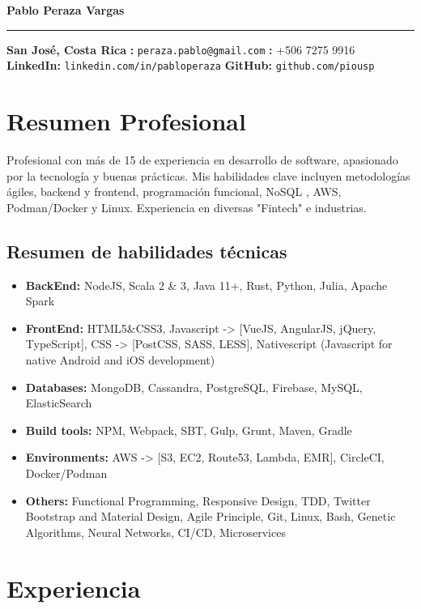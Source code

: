 \documentclass[a4paper,10pt]{article}
\begin{document}
\begin{center}
    {\Large \textbf{Pablo Peraza Vargas}}
    \par\noindent\rule{\textwidth}{1pt}
    \vspace{5pt}
    \textbf{San José, Costa Rica} \quad
    \textbf{\correo:} \texttt{peraza.pablo@gmail.com} \quad
    \textbf{\tel:} +506 7275 9916 \\
    \textbf{LinkedIn:} \texttt{linkedin.com/in/pabloperaza} \quad
    \textbf{GitHub:} \texttt{github.com/piousp}
\end{center}

\section*{Resumen Profesional}
Profesional con más de 15 de experiencia en desarrollo de software, 
apasionado por la tecnología y buenas prácticas. Mis habilidades clave 
incluyen metodologías ágiles, backend y frontend, programación funcional, NoSQL , 
AWS, Podman/Docker y Linux. Experiencia en diversas "Fintech" e industrias.

\subsection*{Resumen de habilidades técnicas}
\begin{itemize}
    \item \textbf{BackEnd:} NodeJS, Scala 2 & 3, Java 11+, Rust, Python, Julia, Apache Spark
    \item \textbf{FrontEnd:} HTML5\&CSS3, Javascript -> [VueJS, AngularJS, jQuery, TypeScript],
     CSS -> [PostCSS, SASS, LESS], Nativescript (Javascript for native Android and iOS development)
    \item \textbf{Databases:} MongoDB, Cassandra, PostgreSQL, Firebase, MySQL, ElasticSearch
    \item \textbf{Build tools:} NPM, Webpack, SBT, Gulp, Grunt, Maven, Gradle
    \item \textbf{Environments:} AWS -> [S3, EC2, Route53, Lambda, EMR], CircleCI, Docker/Podman
    \item \textbf{Others:} Functional Programming, Responsive Design, TDD, 
    Twitter Bootstrap and Material Design, Agile Principle, Git, 
    Linux, Bash, Genetic Algorithms, Neural Networks, CI/CD, Microservices
\end{itemize}

\section*{Experiencia}
\end{document}
